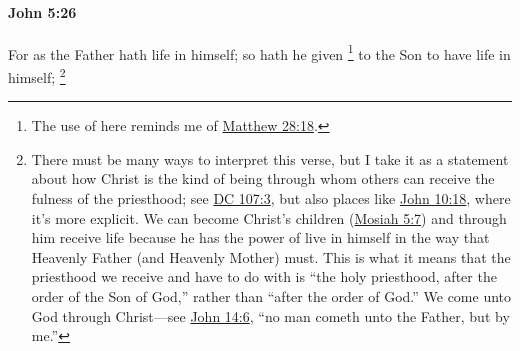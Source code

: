 			\begin{framed}
			\scriptsize
				\begin{compactdesc}
					\item[SBLG] 
				\end{compactdesc}
			\end{framed}

		\paragraph{John 5:26} %
			\label{JOHN-5-26}

			For as the Father hath life in himself; so hath he given%
				\footnote{%
					The use of  here reminds me of \hyperref[MATTHEW-28-18]{Matthew 28:18}.
					}
			to the Son to have life in himself;%
				\footnote{%
					There must be many ways to interpret this verse, but I take it as a statement about how Christ is the kind of being through whom others can receive the fulness of the priesthood; see \hyperref[DC107-3]{DC 107:3}, but also places like \hyperref[JOHN-10-18]{John 10:18}, where it's more explicit. We can become Christ's children (\hyperref[MOSIAH-5-7]{Mosiah 5:7}) and through him receive life because he has the power of live in himself in the way that Heavenly Father (and Heavenly Mother) must. This is what it means that the priesthood we receive and have to do with is ``the holy priesthood, after the order of the Son of God,'' rather than ``after the order of God.'' We come unto God through Christ---see \hyperref[JOHN-14-6]{John 14:6}, ``no man cometh unto the Father, but by me.''
					}
			
